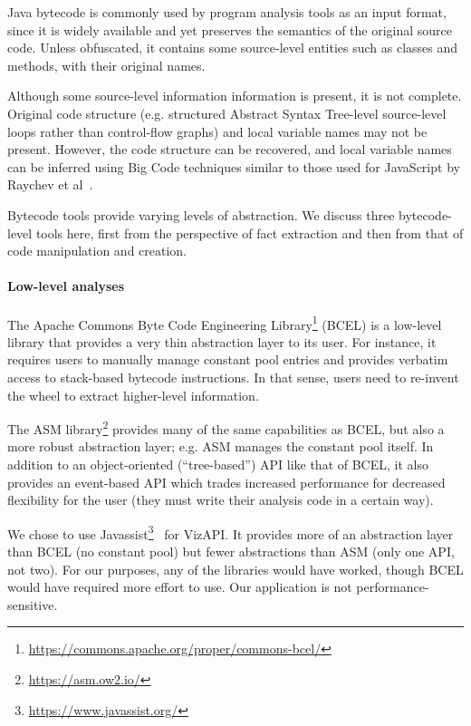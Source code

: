 Java bytecode is commonly used by program analysis tools as an input
format, since it is widely available and yet preserves the semantics
of the original source code. Unless obfuscated, it contains some
source-level entities such as classes and methods, with their original
names.

Although some source-level information information is present, it is
not complete. Original code structure (e.g. structured Abstract Syntax
Tree-level source-level loops rather than control-flow graphs) and
local variable names may not be present. However, the code structure
can be recovered, and local variable names can be inferred using Big
Code techniques similar to those used for JavaScript by Raychev et
al~\cite{raychev2016learning}.

Bytecode tools provide varying levels of abstraction. We discuss three
bytecode-level tools here, first from the perspective of fact extraction
and then from that of code manipulation and creation.

\paragraph{Low-level analyses}
The Apache Commons Byte Code Engineering Library\footnote{\url{https://commons.apache.org/proper/commons-bcel/}} (BCEL) is a low-level library that
provides a very thin abstraction layer to its user. For instance,
it requires users to manually manage constant pool entries and provides
verbatim access to stack-based bytecode instructions. In that sense,
users need to re-invent the wheel to extract higher-level information.

The ASM library\footnote{\url{https://asm.ow2.io/}} provides many of
the same capabilities as BCEL, but also a more robust
abstraction layer; e.g. ASM manages the constant pool
itself. In addition to an object-oriented (``tree-based'') API like
that of BCEL, it also provides an event-based API which trades increased
performance for decreased flexibility for the user (they must write
their analysis code in a certain way).

We chose to use
Javassist\footnote{\url{https://www.javassist.org/}}~\cite{chiba00:_load_struc_reflec_java}
for VizAPI. It provides more of an abstraction layer than BCEL (no
constant pool) but fewer abstractions than ASM (only one API, not
two). For our purposes, any of the libraries would have
worked, though BCEL would have required more effort to use. Our application
is not performance-sensitive.

